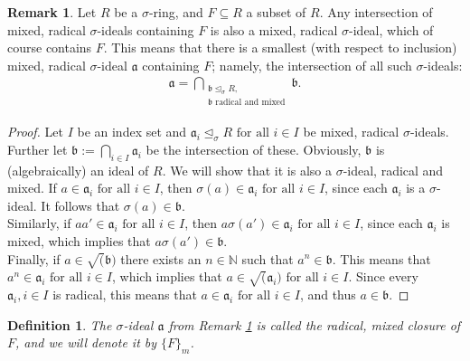 \documentclass{article}
\def\N{\mathbb{N}}
\def\a{\mathfrak{a}}
\def\b{\mathfrak{b}}
\def\s{\sigma}
\def\si{\unlhd_{\sigma}}
\def\fa{\text{ for all }}
\theoremstyle{plain}
\newtheorem{defn}[Satz]{Definition}
\theoremstyle{definition}
\newtheorem{rem}[Satz]{Remark}
\begin{document}
\begin{rem}\label{wmwelldef}
Let $R$ be a $\s$-ring, and $F \subseteq R$ a subset of $R$. Any intersection of mixed, radical $\s$-ideals containing $F$ is also a mixed, radical $\s$-ideal, which of course contains $F$. 
This means that there is a smallest (with respect to inclusion) mixed, radical $\s$-ideal $\a$ containing $F$; namely, the intersection of all such $\s$-ideals:
\begin{align*} \a = \bigcap_{\substack{ \b \si R, \\ \b \text{ radical and mixed}}} \b. \end{align*}
\begin{proof}
Let $I$ be an index set and $\a_i \si R \fa i \in I$ be mixed, radical $\s$-ideals. Further let $\b := \bigcap_{i \in I} \a_i$ be the intersection of these. Obviously, $\b$ is (algebraically) an ideal of $R$. We will show that it is also a $\s$-ideal, radical and mixed.
If $a \in \a_i \fa i \in I$, then $\s(a) \in \a_i \fa i \in I$, since each $\a_i$ is a $\s$-ideal.
It follows that $\s(a) \in \b$. \\
\indent Similarly, if $aa' \in \a_i \fa i \in I$, then $a \s(a') \in \a_i \fa i \in I$, since each $\a_i$ is mixed, which implies that $a \s(a') \in \b$.  \\
\indent Finally, if $a \in \sqrt(\b)$ there exists an $n \in \N$ such that $a^n \in \b$. This means that $a^n \in \a_i \fa i \in I$, which implies that $a \in \sqrt(\a_i) \fa i \in I$. Since every $\a_i, i \in I$ is radical, this means that $a \in \a_i \fa i \in I$,
and thus $a \in \b$.
\end{proof}
\end{rem}

\begin{defn}
The $\s$-ideal $\a$ from Remark \ref{wmwelldef} is called the radical, mixed closure of $F$, and we will denote it by $\{F\}_{m}$.
\end{defn}
\end{document}
